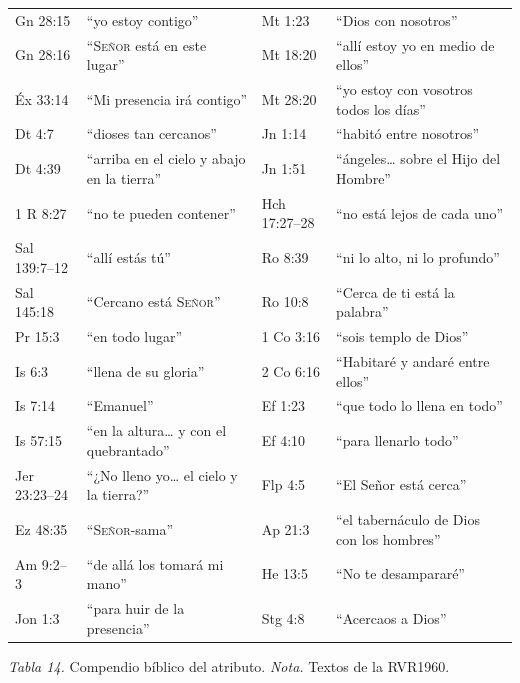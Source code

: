 \documentclass[11pt,letterpaper]{article}
\newcommand{\SENOR}{\textsc{Señor}}
\begin{document}
\begin{center}\small\renewcommand{\arraystretch}{1.12}
\begin{tabular}{@{}L{2.2cm}L{5.0cm}|L{2.2cm}L{5.0cm}@{}}
\toprule
Gn 28:15 & ``yo estoy contigo'' & Mt 1:23 & ``Dios con nosotros'' \\
Gn 28:16 & ``\SENOR{} está en este lugar'' & Mt 18:20 & ``allí estoy yo en medio de ellos'' \\
Éx 33:14 & ``Mi presencia irá contigo'' & Mt 28:20 & ``yo estoy con vosotros todos los días'' \\
Dt 4:7 & ``dioses tan cercanos'' & Jn 1:14 & ``habitó entre nosotros'' \\
Dt 4:39 & ``arriba en el cielo y abajo en la tierra'' & Jn 1:51 & ``ángeles\ldots{} sobre el Hijo del Hombre'' \\
1 R 8:27 & ``no te pueden contener'' & Hch 17:27--28 & ``no está lejos de cada uno'' \\
Sal 139:7--12 & ``allí estás tú'' & Ro 8:39 & ``ni lo alto, ni lo profundo'' \\
Sal 145:18 & ``Cercano está \SENOR{}'' & Ro 10:8 & ``Cerca de ti está la palabra'' \\
Pr 15:3 & ``en todo lugar'' & 1 Co 3:16 & ``sois templo de Dios'' \\
Is 6:3 & ``llena de su gloria'' & 2 Co 6:16 & ``Habitaré y andaré entre ellos'' \\
Is 7:14 & ``Emanuel'' & Ef 1:23 & ``que todo lo llena en todo'' \\
Is 57:15 & ``en la altura\ldots{} y con el quebrantado'' & Ef 4:10 & ``para llenarlo todo'' \\
Jer 23:23--24 & ``¿No lleno yo\ldots{} el cielo y la tierra?'' & Flp 4:5 & ``El Señor está cerca'' \\
Ez 48:35 & ``\SENOR{}-sama'' & Ap 21:3 & ``el tabernáculo de Dios con los hombres'' \\
Am 9:2--3 & ``de allá los tomará mi mano'' & He 13:5 & ``No te desampararé'' \\
Jon 1:3 & ``para huir de la presencia'' & Stg 4:8 & ``Acercaos a Dios'' \\
\bottomrule
\end{tabular}\par
{\footnotesize\color{gris}\textit{Tabla 14.} Compendio bíblico del atributo. \textit{Nota.} Textos de la RVR1960.}
\end{center}

\end{document}
